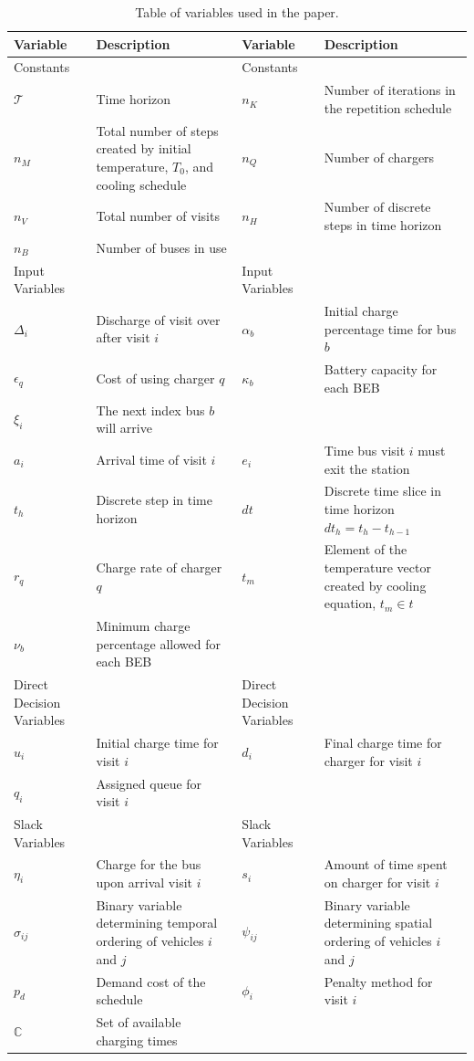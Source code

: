 \documentclass[energies,article,submit,moreauthors]{Definitions/mdpi}
\newcommand{\T}{\mathcal{T}}                %
\newcommand{\Tau}{T}                        %
\newcommand{\C}{\mathbb{C}}                 %
\begin{document}
\begin{table}[htbp]
\caption{\label{tab:sa-variables}Table of variables used in the paper.}
\centering
\begin{tabularx}{\textwidth}{L{0.3} L{1.2} L{0.3} L{1.2}}
\textbf{Variable} & \textbf{Description} & \textbf{Variable} & \textbf{Description}\\[0pt]
\hline
Constants &  & Constants & \\[0pt]
\(\T\) & Time horizon & \(n_K\) & Number of iterations in the repetition schedule\\[0pt]
\(n_M\) & Total number of steps created by initial temperature, \(\Tau_0\), and cooling schedule & \(n_Q\) & Number of chargers\\[0pt]
\(n_V\) & Total number of visits & \(n_H\) & Number of discrete steps in time horizon\\[0pt]
\(n_B\) & Number of buses in use &  & \\[0pt]
\hline
Input Variables &  & Input Variables & \\[0pt]
\(\Delta_i\) & Discharge of visit over after visit \(i\) & \(\alpha_b\) & Initial charge percentage time for bus \(b\)\\[0pt]
\(\epsilon_q\) & Cost of using charger \(q\) & \(\kappa_b\) & Battery capacity for each BEB\\[0pt]
\(\xi_i\) & The next index bus \(b\) will arrive &  & \\[0pt]
\(a_i\) & Arrival time of visit \(i\) & \(e_i\) & Time bus visit \(i\) must exit the station\\[0pt]
\(t_h\) & Discrete step in time horizon & \(dt\) & Discrete time slice in time horizon \(dt_h = t_h - t_{h-1}\)\\[0pt]
\(r_q\) & Charge rate of charger \(q\) & \(t_m\) & Element of the temperature vector created by cooling equation, \(t_m \in t\)\\[0pt]
\(\nu_b\) & Minimum charge percentage allowed for each BEB &  & \\[0pt]
\hline
Direct Decision Variables &  & Direct Decision Variables & \\[0pt]
\(u_i\) & Initial charge time for visit \(i\) & \(d_i\) & Final charge time for charger for visit \(i\)\\[0pt]
\(q_i\) & Assigned queue for visit \(i\) &  & \\[0pt]
Slack Variables &  & Slack Variables & \\[0pt]
\(\eta_i\) & Charge for the bus upon arrival visit \(i\) & \(s_i\) & Amount of time spent on charger for visit \(i\)\\[0pt]
\(\sigma_{ij}\) & Binary variable determining temporal ordering of vehicles \(i\) and \(j\) & \(\psi_{ij}\) & Binary variable determining spatial ordering of vehicles \(i\) and \(j\)\\[0pt]
\(p_{d}\) & Demand cost of the schedule & \(\phi_i\) & Penalty method for visit \(i\)\\[0pt]
\(\C\) & Set of available charging times &  & \\[0pt]
\hline
\end{tabularx}
\end{table}
\end{document}
